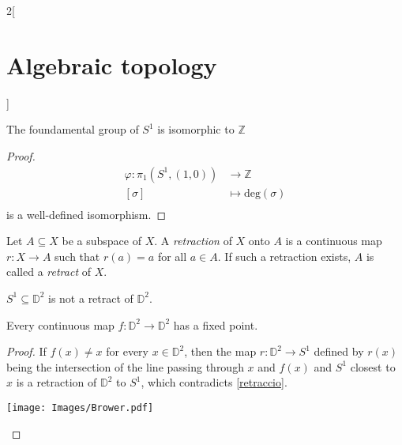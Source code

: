 \documentclass[../../../main_math.tex]{subfiles}
\begin{document}
\begin{multicols}{2}[\section{Algebraic topology}]
  \begin{theorem}
    The foundamental group of $S^1$ is isomorphic to $\mathbb{Z}$
  \end{theorem}

  \begin{proof}
    \begin{align*}
      \varphi: \pi_1(S^1, (1,0)) & \longrightarrow \mathbb{Z}     \\
      [\sigma]                   & \longmapsto \text{deg}(\sigma) \\
    \end{align*}
    is a well-defined isomorphism.
  \end{proof}

  \begin{definition}
    Let $A\subseteq X$ be a subspace of $X$. A \emph{retraction} of $X$ onto $A$ is a continuous map $r: X \to A$ such that $r(a)=a$ for all $a\in A$. If such a retraction exists, $A$ is called a \emph{retract} of $X$.
  \end{definition}

  \begin{corollary}\label{retraccio}
    $S^1\subseteq \mathbb{D}^2$ is not a retract of $\mathbb{D}^2$.
  \end{corollary}


  \begin{theorem}
    \label{Brower}
    Every continuous map $f:\mathbb{D}^2 \to \mathbb{D}^2$ has a fixed point.
  \end{theorem}

  \begin{proof}

    \begin{minipage}{0.3\textwidth}
      If $f(x)\neq x$ for every $x\in \mathbb{D}^2$, then the map $r: \mathbb{D}^2 \to S^1$ defined by $r(x)$ being the intersection of the line passing through $x$ and $f(x)$ and $S^1$ closest to $x$ is a retraction of $\mathbb{D}^2$ to $S^1$, which contradicts \cref{retraccio}.
    \end{minipage}
    \begin{minipage}{0.2\textwidth}
      \begin{center}
        \texttt{[image: Images/Brower.pdf]}
      \end{center}
    \end{minipage}

  \end{proof}


\end{multicols}
\end{document}
